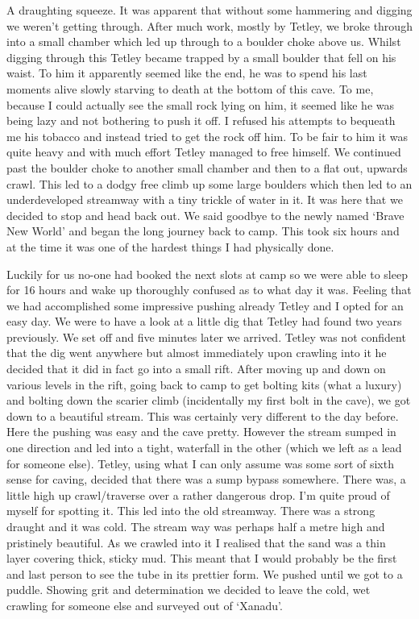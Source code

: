 A draughting squeeze. It was apparent that without some hammering and digging we weren’t getting through. After much work, mostly by Tetley, we broke through into a small chamber which led up through to a boulder choke above us. Whilst digging through this Tetley became trapped by a small boulder that fell on his waist. To him it apparently seemed like the end, he was to spend his last moments alive slowly starving to death at the bottom of this cave. To me, because I could actually see the small rock lying on him, it seemed like he was being lazy and not bothering to push it off. I refused his attempts to bequeath me his tobacco and instead tried to get the rock off him. To be fair to him it was quite heavy and with much effort Tetley managed to free himself. We continued past the boulder choke to another small chamber and then to a flat out, upwards crawl. This led to a dodgy free climb up some large boulders which then led to an underdeveloped streamway with a tiny trickle of water in it. It was here that we decided to stop and head back out. We said goodbye to the newly named ‘Brave New World’ and began the long journey back to camp. This took six hours and at the time it was one of the hardest things I had physically done.

Luckily for us no-one had booked the next slots at camp so we were able to sleep for 16 hours and wake up thoroughly confused as to what day it was. Feeling that we had accomplished some impressive pushing already Tetley and I opted for an easy day. We were to have a look at a little dig that Tetley had found two years previously. We set off and five minutes later we arrived. Tetley was not confident that the dig went anywhere but almost immediately upon crawling into it he decided that it did in fact go into a small rift. After moving up and down on various levels in the rift, going back to camp to get bolting kits (what a luxury) and bolting down the scarier climb (incidentally my first bolt in the cave), we got down to a beautiful stream. This was certainly very different to the day before. Here the pushing was easy and the cave pretty. However the stream sumped in one direction and led into a tight, waterfall in the other (which we left as a lead for someone else). Tetley, using what I can only assume was some sort of sixth sense for caving, decided that there was a sump bypass somewhere. There was, a little high up crawl/traverse over a rather dangerous drop. I’m quite proud of myself for spotting it. This led into the old streamway. There was a strong draught and it was cold. The stream way was perhaps half a metre high and pristinely beautiful. As we crawled into it I realised that the sand was a thin layer covering thick, sticky mud. This meant that I would probably be the first and last person to see the tube in its prettier form. We pushed until we got to a puddle. Showing grit and determination we decided to leave the cold, wet crawling for someone else and surveyed out of ‘Xanadu’.

